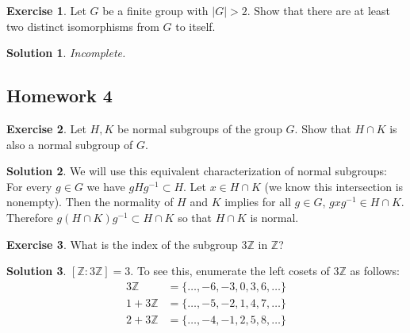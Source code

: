 \documentclass[12pt]{article}
\theoremstyle{definition}
\newcommand{\Z}{\mathbb{Z}}
\newtheorem{exercise}{\color{YellowOrange}Exercise}
\theoremstyle{definition}
\newtheorem{solution}{\color{Goldenrod}Solution}
\begin{document}
\begin{exercise}
Let $G$ be a finite group with $|G| > 2$. Show that there are at least two distinct isomorphisms from $G$ to itself. 
\end{exercise}
\begin{solution}
\it Incomplete.
\end{solution}

\subsection{Homework 4}

\begin{exercise}
Let $H, K$ be normal subgroups of the group $G$. Show that $H \cap K$ is also a normal subgroup of $G$.
\end{exercise}
\begin{solution}
We will use this equivalent characterization of normal subgroups: For every $g \in G$ we have $gHg^{-1} \subset H$. Let $x \in H \cap K$ (we know this intersection is nonempty). Then the normality of $H$ and $K$ implies for all $g \in G$, $gxg^{-1} \in H \cap K$. Therefore $g (H \cap K) g^{-1} \subset H \cap K$ so that $H \cap K$ is normal.
\end{solution}

\begin{exercise}
What is the index of the subgroup $3 \Z$ in $\Z$?
\end{exercise}
\begin{solution}
$[\Z : 3 \Z] = 3$. To see this, enumerate the left cosets of $3\Z$ as follows:
\begin{align*}
3 \Z &= \{ \ldots, -6, -3, 0, 3, 6, \ldots \} \\
1 + 3 \Z &= \{ \ldots, -5, -2, 1, 4, 7, \ldots \} \\
2 + 3 \Z &= \{ \ldots, -4, -1, 2, 5, 8, \ldots \}
\end{align*}
\end{solution}
\end{document}
